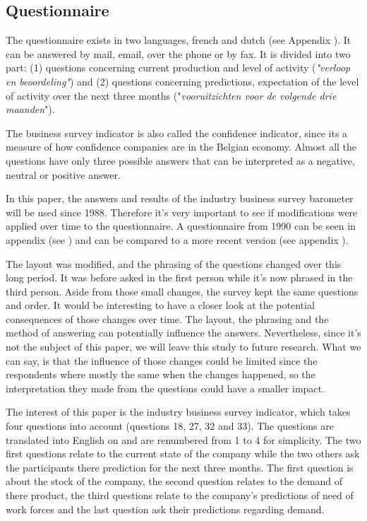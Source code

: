 \documentclass[12pt,a4paper,oneside]{book}
\begin{document}
\subsection{Questionnaire}
\label{sec:Questionnaire}

The questionnaire exists in two languages, french and dutch (see Appendix ). It can be answered by mail, email, over the phone or by fax.
It is divided into two part:
(1) questions concerning current production and level of activity (\textit{"verloop en beoordeling"}) and
(2) questions concerning predictions, expectation of the level of activity over the next three months ("\textit{vooruitzichten voor de volgende drie maanden}").

The business survey indicator is also called the confidence indicator, since its a measure of how confidence companies are in the Belgian economy.
Almost all the questions have only three possible answers that can be interpreted as a negative, neutral or positive answer.

In this paper, the answers and results of the industry business survey barometer will be used since 1988. Therefore it's very important to see if modifications were applied over time to the questionnaire.
A questionnaire from 1990 can be seen in appendix (see ) and can be compared to a more recent version (see appendix ).

The layout was modified, and the phrasing of the questions changed over this long period. It was before asked in the first person while it's now phrased in the third person. Aside from those small changes, the survey kept the same questions and order.
It would be interesting to have a closer look at the potential consequences of those changes over time. The layout, the phrasing and the method of answering can potentially influence the answers. Nevertheless, since it's not the subject of this paper, we will leave this study to future research.
What we can say, is that the influence of those changes could be limited since the respondents where mostly the same when the changes happened, so the interpretation they made from the questions could have a smaller impact.

The interest of this paper is the industry business survey indicator, which takes four questions into account (questions 18, 27, 32 and 33). The questions are translated into English on  and are renumbered from 1 to 4 for simplicity.
The two first questions relate to the current state of the company while the two others ask the participants there prediction for the next three months.
The first question is about the stock of the company, 
the second question relates to the demand of there product, 
the third questions relate to the company's predictions of need of work forces 
and the last question ask their predictions regarding demand.
\end{document}
